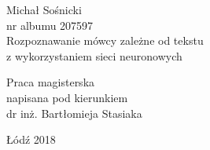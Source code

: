 \begin{titlepage}
\begin{center}
{\Large Michał Sośnicki\\nr albumu 207597\\}
\vspace{2cm}
{\huge Rozpoznawanie mówcy zależne od tekstu \\z wykorzystaniem sieci neuronowych}
\end{center}
\vspace{3cm}
\hfill
\begin{minipage}{.55\columnwidth}
Praca magisterska\\
napisana pod kierunkiem\\
dr inż. Bartłomieja Stasiaka
\end{minipage}
\vfill
\begin{center}
Łódź 2018
\end{center}
\end{titlepage}
